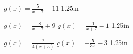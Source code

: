 {
    $g(x) = \frac{5}{x+7} - 11$
}
{1.25in}

\myProblems
{
    $g(x) = \frac{-8}{x+7} + 9$
}
{
    $g(x) = \frac{-1}{x+7} - 1$
}
{1.25in}

\myProblems
{
    $g(x) = \frac{2}{4(x+5)} $
}
{
    $g(x) = -\frac{5}{3x} - 3 $
}
{1.25in}
